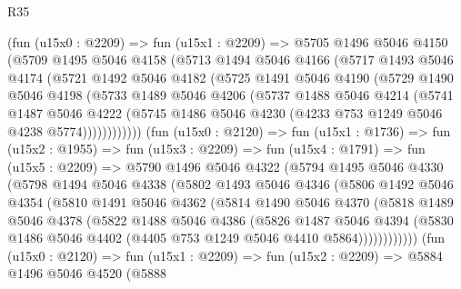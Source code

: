 \begin{lexlean}{R35}
\begin{coremodule}
        (fun (u15x0 : @2209) =>
        fun (u15x1 : @2209) =>
        @5705
          @1496
          @5046
          @4150
          (@5709
            @1495
            @5046
            @4158
            (@5713
              @1494
              @5046
              @4166
              (@5717
                @1493
                @5046
                @4174
                (@5721
                  @1492
                  @5046
                  @4182
                  (@5725
                    @1491
                    @5046
                    @4190
                    (@5729
                      @1490
                      @5046
                      @4198
                      (@5733
                        @1489
                        @5046
                        @4206
                        (@5737
                          @1488
                          @5046
                          @4214
                          (@5741
                            @1487
                            @5046
                            @4222
                            (@5745 @1486 @5046 @4230 (@4233 @753 @1249 @5046 @4238 @5774))))))))))))
        (fun (u15x0 : @2120) =>
        fun (u15x1 : @1736) =>
        fun (u15x2 : @1955) =>
        fun (u15x3 : @2209) =>
        fun (u15x4 : @1791) =>
        fun (u15x5 : @2209) =>
        @5790
          @1496
          @5046
          @4322
          (@5794
            @1495
            @5046
            @4330
            (@5798
              @1494
              @5046
              @4338
              (@5802
                @1493
                @5046
                @4346
                (@5806
                  @1492
                  @5046
                  @4354
                  (@5810
                    @1491
                    @5046
                    @4362
                    (@5814
                      @1490
                      @5046
                      @4370
                      (@5818
                        @1489
                        @5046
                        @4378
                        (@5822
                          @1488
                          @5046
                          @4386
                          (@5826
                            @1487
                            @5046
                            @4394
                            (@5830 @1486 @5046 @4402 (@4405 @753 @1249 @5046 @4410 @5864))))))))))))
        (fun (u15x0 : @2120) =>
        fun (u15x1 : @2209) =>
        fun (u15x2 : @2209) =>
        @5884
          @1496
          @5046
          @4520
          (@5888

\end{coremodule}
\end{lexlean}
